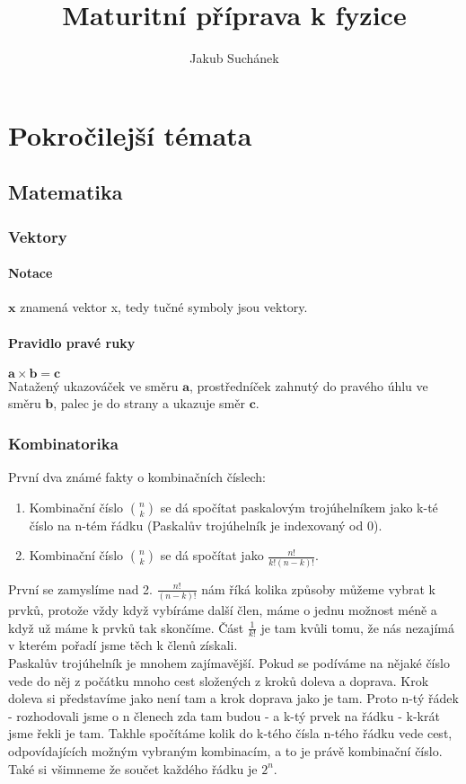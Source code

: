 \documentclass[titlepage]{book}
\title{Maturitní příprava k fyzice}
\author{Jakub Suchánek}
\date{ }
\begin{document}
\maketitle
\tableofcontents{}

\part{Pokročilejší témata}
\chapter{Matematika}
\section{Vektory}
\subsection{Notace}
$\boldsymbol x$ znamená vektor x, tedy tučné symboly jsou vektory.
\subsection{Pravidlo pravé ruky}
$\boldsymbol a \times \boldsymbol b = \boldsymbol c$\\
Natažený ukazováček ve směru $\boldsymbol a$, prostředníček zahnutý do pravého úhlu ve směru $\boldsymbol b$, palec je do strany a ukazuje směr $\boldsymbol c$. 
\section{Kombinatorika}
První dva známé fakty o kombinačních číslech:\\
\begin{enumerate}
\item Kombinační číslo $\binom{n}{k}$ se dá spočítat paskalovým trojúhelníkem jako k-té číslo na n-tém řádku (Paskalův trojúhelník je indexovaný od 0).
\item Kombinační číslo $\binom{n}{k}$ se dá spočítat jako $\frac{n!}{k!(n-k)!}$.
\end{enumerate}
První se zamyslíme nad 2. $\frac{n!}{(n-k)!}$ nám říká kolika způsoby můžeme vybrat k prvků, protože vždy když vybíráme další člen, máme o jednu možnost méně a když už máme k prvků tak skončíme. Část $\frac{1}{k!}$ je tam kvůli tomu, že nás nezajímá v kterém pořadí jsme těch k členů získali.\\
Paskalův trojúhelník je mnohem zajímavější. Pokud se podíváme na nějaké číslo vede do něj z počátku mnoho cest složených z kroků doleva a doprava. Krok doleva si představíme jako není tam a krok doprava jako je tam. Proto n-tý řádek - rozhodovali jsme o n členech zda tam budou - a k-tý prvek na řádku - k-krát jsme řekli je tam. Takhle spočítáme kolik do k-tého čísla n-tého řádku vede cest, odpovídajících možným vybraným kombinacím, a to je právě kombinační číslo. Také si všimneme že součet každého řádku je $2^n$.
\end{document}
